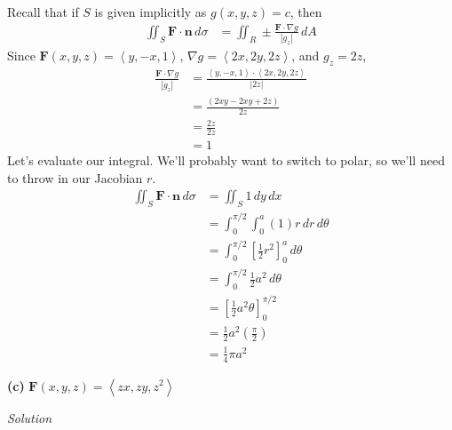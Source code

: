 \documentclass{article}
\newcommand{\lrp}[1]{\left( #1 \right)}
\newcommand{\lra}[1]{\left\langle #1 \right\rangle}
\newcommand{\lrb}[1]{\left[ #1 \right]}
\newcommand{\F}[0]{\mathbf{F}}
\newcommand{\n}[0]{\mathbf{n}}
\newcommand{\Solution}{\textit{Solution}}
\begin{document}
Recall that if $S$ is given implicitly as $g(x,y,z)=c$, then
\begin{align*}
    \iint_S \F\cdot \n \,d\sigma &= \iint_R \pm \frac{\F\cdot \nabla g}{\left|g_z\right|}\,dA
\end{align*}
Since $\F(x,y,z)=\lra{y,-x,1}$, $\nabla g = \lra{2x,2y,2z}$, and $g_z=2z$,
\begin{align*}
    \frac{ \F \cdot \nabla g}{\left|g_z\right|}&=\frac{ \lra{y,-x,1}\cdot \lra{2x,2y,2z}}{\left|2z\right|}\\
    &=\frac{ \lrp{2xy-2xy+2z}}{2z}\tag{we're in the first octant}\\
    &=\frac{2z}{2z}\\
    &=1
\end{align*}
Let's evaluate our integral. We'll probably want to switch to polar, so we'll need to throw in our Jacobian $r$.
\begin{align*}
   \iint_S \F\cdot \n \,d\sigma&= \iint_S 1\,dy\,dx\\
    &=\int_0^{\pi/2}\int_0^a \lrp{1}r\,dr\,d\theta\\
    &=\int_0^{\pi/2}\lrb{\frac{1}{2}r^2}_0^a\,d\theta\\
    &=\int_0^{\pi/2}\frac{1}{2}a^2\,d\theta\\
    &=\lrb{\frac{1}{2}a^2\theta}_0^{\pi/2}\\
    &=\frac{1}{2}a^2\lrp{\frac{\pi}{2}}\\
    &=\boxed{\frac{1}{4}\pi a^2}
\end{align*}

{}\textbf{(c)} $\F(x,y,z)=\lra{zx,zy,z^2}$

\Solution
\end{document}
